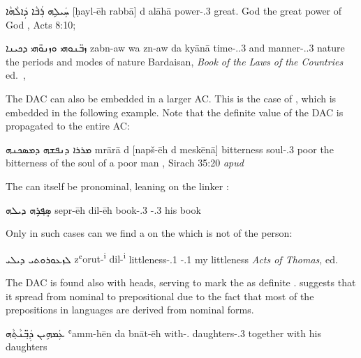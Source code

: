 {{{{
{ܚܲܝܠܹܗ ܪܲܒ݁ܵܐ ܕܲܐܠܵܗܵܐ}
{[ḥayl-ēh rabbā] d\cb{} alāhā}
{\hspace{0.7ex}power-\poss.3\masc{} great.\masc{} \lnk\cb{} God}
{the great power of God}
{\Pesh, Acts 8:10; \cite[89, \S 112j]{MuraokaSyriac}}

{ܙܒ̈ܢܘܗܝ ܘܙܢܘ̈ܗܝ ܕܟܝܢܐ}
{zabn-aw wa\cb{} zn-aw da\cb{} kyānā}
{time-\pl.\poss.3\masc{} and\cb{} manner-\pl.\poss.3\masc{} \lnk\cb{} nature}
{the periods and modes of nature}
{Bardaisan, \textit{Book of the Laws of the Countries} ed.\ \cite[34:10--11]{Drijvers}, \cite[123]{BakkerBardaisan}}

The DAC can also be embedded in a larger AC. This  is the case of , which is embedded in the following example. Note that the definite value of the DAC is  propagated to the entire AC:

{ܡܪܪܐ ܕܢܦܫܗ ܕܡܣܟܢܗ}
{mrārā d\cb{} [napš-ēh d\cb{} meskēnā]}
{bitterness \lnk\cb{} soul-\poss.3\masc{} \lnk\cb{} poor}
{the bitterness of the soul of a poor man}
{\Pesh, Sirach 35:20 \textit{apud}\linebreak \cite[207]{PeursenBenSira}}

The \secn can itself be pronominal, leaning on the linker :

{ܣܸܦ݂ܪܹܗ ܕܝܠܗ}
{sepr-ēh dil-ēh}
{book-\poss.3\masc{} \lnk-\poss.3\masc}
{his book}
{\cite[71, \S 91f]{MuraokaSyriac}}

Only in such cases can we find a  on the \prim which is not of the \third person:

{ܠܙܥܘܪܘܬܝ ܕܝܠܝ}
{zʿorut-\textsuperscript{i} dil-\textsuperscript{i}}
{littleness-\poss.1\sg{} \lnk-\poss.1\sg}
{my littleness}
{\textit{Acts of Thomas}, ed.\ \cite[]{WrightActs}}

The DAC  is found also with  heads, serving to mark the \secn as definite \citep[371]{MengozziExtended}. \citet[324]{PatElContact} suggests that it spread from nominal \prims to prepositional \prims due to the fact that most of the prepositions in  languages are derived from nominal forms. 

{ܥܲܡܗܹܝܢ ܕܲܒ݂̈ܢܵܬ݂ܵܗ}
{ʿamm-hēn da\cb{} bnāt-ēh}
{with-\poss.\fpl{} \lnk\cb{} daughters-\poss.3\masc{}}
{together with his daughters}
{\cite[88, \S 111e]{MuraokaSyriac}}

}}}}
